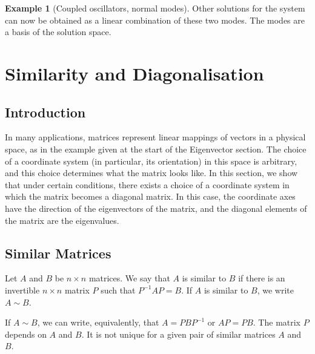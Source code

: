 \documentclass[
  a4paper,
  DIV=11,
  numbers=noendperiod,
  oneside]{scrreprt}
\theoremstyle{definition}
\newtheorem{example}{Example}[chapter]
\theoremstyle{remark}
\newenvironment{fbxSimple}[3]{\begin{tcolorbox}[enhanced, breakable,%
attach boxed title to top*={xshift=1.4pt},
boxed title style={boxrule=0.0mm, fuzzy shadow={1pt}{-1pt}{0mm}{0.1mm}{gray}, arc=.3em, rounded corners=east, sharp corners=west}, colframe=#1-color2, colbacktitle=#1-color1, colback = white, coltitle=black,  titlerule=0mm, toprule=0pt, bottomrule=.7pt, leftrule=.3em, rightrule=.7pt, outer arc=.3em,  	left=.5em, right=.5em, bottomtitle=1mm, toptitle=1mm,title=\textbf{#2}\hspace{0.5em}{#3}]}
{\end{tcolorbox}}
\begin{document}
\begin{example}[Coupled oscillators, normal
modes]
Other solutions for the system can now be obtained as a linear
combination of these two modes. The modes are a basis of the solution
space.

\end{example}

\section{Similarity and
Diagonalisation}\label{similarity-and-diagonalisation}

\subsection{Introduction}\label{introduction-2}

In many applications, matrices represent linear mappings of vectors in a
physical space, as in the example given at the start of the Eigenvector
section. The choice of a coordinate system (in particular, its
orientation) in this space is arbitrary, and this choice determines what
the matrix looks like. In this section, we show that under certain
conditions, there exists a choice of a coordinate system in which the
matrix becomes a diagonal matrix. In this case, the coordinate axes have
the direction of the eigenvectors of the matrix, and the diagonal
elements of the matrix are the eigenvalues.

\subsection{Similar Matrices}\label{similar-matrices}

\label{similar-matrices-1}
\begin{fbxSimple}{Definition}{Definition 5.9: }{Similar Matrices}
\label{similar-matrices-1}
Let \(A\) and \(B\) be \(n \times n\) matrices. We say that \(A\) is
similar to \(B\) if there is an invertible \(n \times n\) matrix \(P\)
such that \(P^{-1}AP = B\). If \(A\) is similar to \(B\), we write
\(A \sim B\).

\end{fbxSimple}

\begin{tcolorbox}[enhanced jigsaw, opacitybacktitle=0.6, left=2mm, breakable, bottomrule=.15mm, colbacktitle=quarto-callout-note-color!10!white, leftrule=.75mm, titlerule=0mm, rightrule=.15mm, toprule=.15mm, colback=white, toptitle=1mm, colframe=quarto-callout-note-color-frame, coltitle=black, bottomtitle=1mm, title=\textcolor{quarto-callout-note-color}{\faInfo}\hspace{0.5em}{Remark}, opacityback=0, arc=.35mm]

If \(A \sim B\), we can write, equivalently, that \(A = PBP^{-1}\) or
\(AP = PB\). The matrix \(P\) depends on \(A\) and \(B\). It is not
unique for a given pair of similar matrices \(A\) and \(B\).

\end{tcolorbox}
\end{document}
